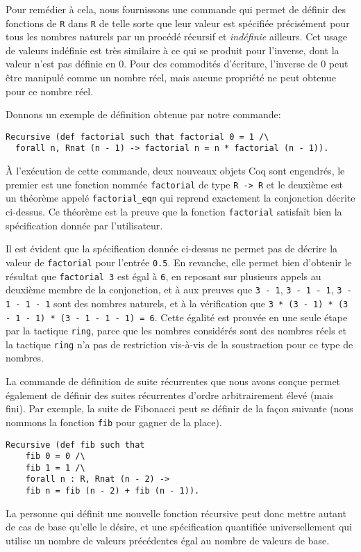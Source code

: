 \documentclass[draft]{jflart}
\begin{document}
Pour remédier à cela, nous fournissons une commande qui permet de
définir des fonctions de \texttt{R} dans \texttt{R} de telle sorte que leur
valeur est spécifiée précisément pour tous les nombres naturels par un
procédé récursif et {\em indéfinie} ailleurs.  Cet usage de valeurs
indéfinie est très similaire à ce qui se produit pour l'inverse, dont
la valeur n'est pas définie en 0.  Pour des commodités d'écriture,
l'inverse de 0 peut être manipulé comme un nombre réel, mais aucune
propriété ne peut obtenue pour ce nombre réel.

Donnons un exemple de définition obtenue par notre commande:
\begin{verbatim}
Recursive (def factorial such that factorial 0 = 1 /\
  forall n, Rnat (n - 1) -> factorial n = n * factorial (n - 1)).
\end{verbatim}
À l'exécution de cette commande, deux nouveaux objets Coq sont
engendrés, le premier est une fonction nommée \texttt{factorial} de
type \texttt{R -> R} et le
deuxième est un théorème appelé \texttt{factorial\_eqn}
qui reprend exactement la conjonction décrite ci-dessus.  Ce théorème
est la preuve que la fonction \texttt{factorial} satisfait bien la
spécification donnée par l'utilisateur.

Il est évident que la spécification donnée ci-dessus ne permet pas de
décrire la valeur de \texttt{factorial} pour l'entrée \texttt{0.5}.
En revanche, elle permet bien d'obtenir le résultat que
\texttt{factorial 3} est égal à \texttt{6}, en reposant sur plusieurs
appels au deuxième membre de la conjonction, et à aux preuves que
\texttt{3 - 1}, \texttt{3 - 1 - 1}, \texttt{3 - 1 - 1 - 1} sont des
nombres naturels, et à la vérification que \texttt{3 * (3 - 1) * (3 -
  1 - 1) * (3 - 1 - 1 - 1) = 6}.  Cette égalité est prouvée en une
seule étape par la tactique \texttt{ring}, parce que les nombres
considérés sont des nombres réels et la tactique \texttt{ring} n'a pas de
restriction vis-à-vis de la soustraction pour ce type de nombres.

La commande de définition de suite récurrentes que nous avons conçue permet
également de définir des suites récurrentes d'ordre arbitrairement élevé
(mais fini).  Par exemple,  la suite de Fibonacci peut se définir de la façon
suivante (nous nommons la fonction \texttt{fib} pour gagner de la place).

\begin{verbatim}
Recursive (def fib such that
    fib 0 = 0 /\
    fib 1 = 1 /\
    forall n : R, Rnat (n - 2) ->
    fib n = fib (n - 2) + fib (n - 1)).
\end{verbatim}
La personne qui définit une nouvelle fonction récursive peut donc
mettre autant de cas de base qu'elle le désire, et une spécification
quantifiée universellement qui utilise un nombre de valeurs
précédentes égal au nombre de valeurs de base.
\end{document}

